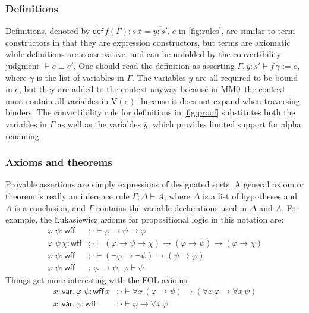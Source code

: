 \documentclass[runningheads]{llncs}
\newcommand{\mmO}{\textsf{MM0}}
\begin{document}
\subsubsection{Definitions}
Definitions, denoted by $\mathsf{def}\,f(\Gamma):s\,\overline{x}=\overline{y:s'}.\;e$ in \autoref{fig:rules}, are similar to term constructors in that they are expression constructors, but terms are axiomatic while definitions are conservative, and can be unfolded by the convertibility judgment $\vdash e\equiv e'$. One should read the definition as asserting $\Gamma,\overline{y:s'}\vdash f\,\overline{\gamma}:=e$, where $\overline{\gamma}$ is the list of variables in $\Gamma$. The variables $\overline{y}$ are all required to be bound in $e$, but they are added to the context anyway because in \mmO\ the context must contain all variables in $\mathrm{V}(e)$, because it does not expand when traversing binders. The convertibility rule for definitions in \autoref{fig:proof} substitutes both the variables in $\Gamma$ as well as the variables $\overline{y}$, which provides limited support for alpha renaming.

\subsubsection{Axioms and theorems}
Provable assertions are simply expressions of designated sorts. A general axiom or theorem is really an inference rule $\Gamma;\Delta\vdash A$, where $\Delta$ is a list of hypotheses and $A$ is a conclusion, and $\Gamma$ contains the variable declarations used in $\Delta$ and $A$. For example, the \L ukasiewicz axioms for propositional logic in this notation are:
\begin{align*}
  \varphi\;\psi:\mathsf{wff}&;\cdot\vdash \varphi\to\psi\to\varphi\\
  \varphi\;\psi\,\chi:\mathsf{wff}&;\cdot\vdash (\varphi\to\psi\to\chi)\to(\varphi\to\psi)\to(\varphi\to\chi)\\
  \varphi\;\psi:\mathsf{wff}&;\cdot\vdash (\neg\varphi\to\neg\psi)\to(\psi\to\varphi)\\
  \varphi\;\psi:\mathsf{wff}&;\ \varphi\to\psi,\ \varphi\vdash \psi
\end{align*}
Things get more interesting with the FOL axioms:
\begin{align*}
  x:\mathsf{var},\varphi\;\psi:\mathsf{wff}\,x&;\cdot\vdash\forall x\,(\varphi\to\psi)\to(\forall x\,\varphi\to\forall x\,\psi)\\
  x:\mathsf{var},\varphi:\mathsf{wff}&;\cdot\vdash\varphi\to\forall x\,\varphi
\end{align*}
\end{document}
